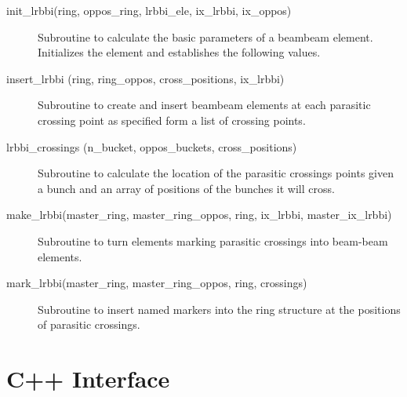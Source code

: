 \begin{description}

\item[init\_lrbbi(ring, oppos\_ring, lrbbi\_ele, ix\_lrbbi, ix\_oppos)] \Newline 
     Subroutine to calculate the basic parameters of a beambeam element. 
     Initializes the element and establishes the following values.

\item[insert\_lrbbi (ring, ring\_oppos, cross\_positions, ix\_lrbbi)] \Newline
Subroutine to create and insert beambeam elements at each parasitic crossing
point as specified form a list of crossing points.

\item[lrbbi\_crossings (n\_bucket, oppos\_buckets, cross\_positions)] \Newline
Subroutine to calculate the location of the parasitic crossings points 
given a bunch and an array of positions of the bunches it will cross. 

\item[make\_lrbbi(master\_ring, master\_ring\_oppos, ring, ix\_lrbbi, master\_ix\_lrbbi)] \Newline
Subroutine to turn elements marking parasitic crossings into beam-beam elements. 

\item[mark\_lrbbi(master\_ring, master\_ring\_oppos, ring, crossings)] \Newline
Subroutine to insert named markers into the ring structure at the positions of parasitic crossings. 

\end{description}

\section{C++ Interface}
\label{r:cpp}      

